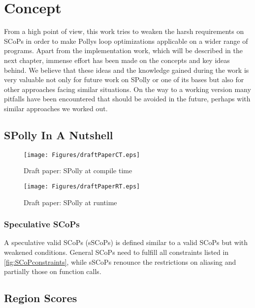 
\chapter{Concept} %
\label{Chapter3}

From a high point of view, this work tries to weaken the harsh requirements on 
SCoPs in order to make Pollys loop optimizations applicable on a wider range of
programs. Apart from the implementation work, which will be described in the 
next chapter, immense effort has been made on the concepts and key ideas behind.
We believe that these ideas and the knowledge gained during the work is very 
valuable not only for future work on SPolly or one of its bases but also for
other approaches facing similar situations. On the way to a working version 
many pitfalls have been encountered that should be avoided in the future, 
perhaps with similar approaches we worked out. 


\section{SPolly In A Nutshell}

\clearpage
\begin{figure}[htbp]
  \centering
  \texttt{[image: Figures/draftPaperCT.eps]}
  \caption{Draft paper: SPolly at compile time}
  \label{fig:draftPaperCT}  
\end{figure}


\begin{figure}[htbp]
  \centering
  \texttt{[image: Figures/draftPaperRT.eps]}
  \caption{Draft paper: SPolly at runtime}
  \label{fig:draftPaperCT}  
\end{figure}
\clearpage


\subsection{Speculative SCoPs}
A speculative valid SCoPs (sSCoPs) is defined similar to a valid SCoPs but with 
weakened conditions. General SCoPs need to fulfill all constraints listed in
\ref{fig:SCoPconstraints}, while sSCoPs renounce the restrictions on aliasing
and partially those on function calls.




\section{Region Scores}

